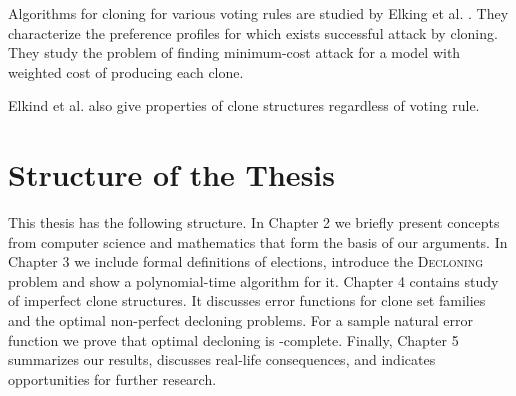 Algorithms for cloning for various voting rules are studied by Elking et al. \cite{cloninginelections}.
They characterize the preference profiles for which exists successful attack by cloning.
They study the problem of finding minimum-cost attack for a model with weighted cost of producing each clone.

Elkind et al. \cite{clonestructures} also give properties of clone structures regardless of voting rule.


\section{Structure of the Thesis}

This thesis has the following structure.
In Chapter 2 we briefly present concepts from computer science
and mathematics that form the basis of our arguments.
In Chapter 3 we include formal definitions of elections, introduce the \textsc{Decloning} problem
and show a polynomial-time algorithm for it.
Chapter 4 contains study of imperfect clone structures.
It discusses error functions for clone set families and the optimal non-perfect decloning problems.
For a sample natural error function we prove that optimal decloning is \np-complete.
Finally, Chapter 5 summarizes our results, discusses real-life consequences,
and indicates opportunities for further research.
